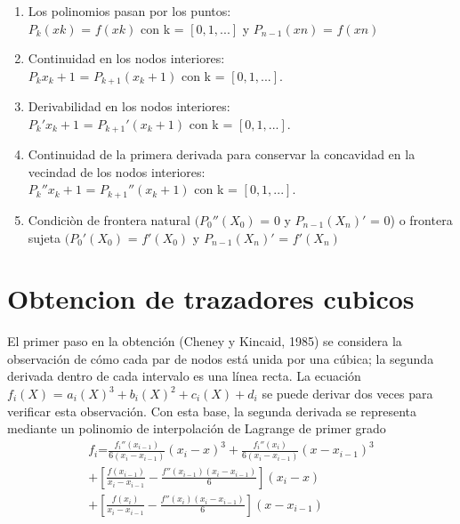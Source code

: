 \documentclass[conference]{IEEEtran}
\begin{document}
\begin{enumerate}
    \item Los polinomios pasan por los puntos: \\ $P_k (xk)$ = $f(xk)$ 
    con k = $[0,1,...]$ y $P_{n - 1} (xn)$ = $f(xn)$
    \item  Continuidad en los nodos interiores: \\
     $P_k{x_k + 1}$ = $P_{k + 1}(x_k +1)$ con k = $[0,1,...]$.
     
    \item Derivabilidad en los nodos interiores: \\$P_k'{x_k + 1}$ = $P_{k + 1}'(x_k +1)$ con k = $[0,1,...]$.
    
    \item Continuidad de la primera derivada para conservar la concavidad en la vecindad de los nodos interiores:\\
    $P_k''{x_k + 1}$ = $P_{k + 1}''(x_k +1)$ con k = $[0,1,...]$.
    
    \item Condiciòn de frontera natural $(P_0''(X_0)$ = $0$ y $P_{n-1}(X_n)'$ = $0$) o frontera sujeta $(P_0'(X_0)$ = $f'(X_0)$ y $P_{n-1}(X_n)'$ = $f'(X_n)$
    
\end{enumerate}

\section{Obtencion de trazadores cubicos }

El primer paso en la obtención (Cheney y Kincaid, 1985) se
considera la observación de cómo cada par de nodos está unida
por una cúbica; la segunda derivada dentro de cada intervalo es
una línea recta. La ecuación \\
$ f_i(X)$ = $a_i(X)^3 + b_i(X)^2 + c_i(X) + d_i$
se puede derivar dos veces
para verificar esta observación. Con esta base, la segunda derivada se representa mediante un polinomio de interpolación de
Lagrange de primer grado \\

\begin{multline}
	f_{i} \text{=} \frac{f_{i}''(x_{i - 1})}{6 (x_{i} - x_{i - 1})}{(x_{i} - x)}^{3}
	+ \frac{f_{i}''(x_{i})}{6 (x_{i} - x_{i - 1})}{(x - x_{i - 1})}^{3} \\
	+ [\frac{f(x_{i - 1})}{x_{i} - x_{i - 1}} - \frac{f''(x_{i - 1}) (x_{i} - x_{i - 1})}{6}](x_{i} - x) \\
	+ [\frac{f(x_{i})}{x_{i} - x_{i - 1}} - \frac{f''(x_{i}) (x_{i} - x_{i - 1})}{6}](x - x_{i - 1}) \\
	\label{eq:C.18.36}
 \end{multline}
\end{document}
